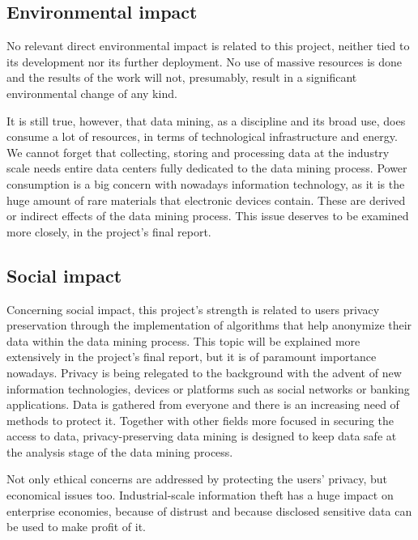 \subsection{Environmental impact}

No relevant direct environmental impact is related to this project, neither tied to its development nor its further deployment. No use of massive resources is done and the results of the work will not, presumably, result in a significant environmental change of any kind.

It is still true, however, that data mining, as a discipline and its broad use, does consume a lot of resources, in terms of technological infrastructure and energy. We cannot forget that collecting, storing and processing data at the industry scale needs entire data centers fully dedicated to the data mining process. Power consumption is a big concern with nowadays information technology, as it is the huge amount of rare materials that electronic devices contain. These are derived or indirect effects of the data mining process. This issue deserves to be examined more closely, in the project’s final report.

\subsection{Social impact}

Concerning social impact, this project’s strength is related to users privacy preservation through the implementation of algorithms that help anonymize their data within the data mining process. This topic will be explained more extensively in the project’s final report, but it is of paramount importance nowadays. Privacy is being relegated to the background with the advent of new information technologies, devices or platforms such as social networks or banking applications. Data is gathered from everyone and there is an increasing need of methods to protect it. Together with other fields more focused in securing the access to data, privacy-preserving data mining is designed to keep data safe at the analysis stage of the data mining process.

Not only ethical concerns are addressed by protecting the users’ privacy, but economical issues too. Industrial-scale information theft has a huge impact on enterprise economies, because of distrust and because disclosed sensitive data can be used to make profit of it.
